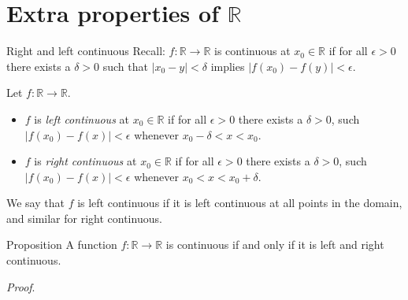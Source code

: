 \documentclass [aspectratio=169]{beamer}
\newcommand{\R}{{\mathbb{R}}}
\begin{document}
\begin{frame}

\end{frame}

\section{Extra properties of $\R$}


\begin{frame}{Right and left continuous}
Recall: $f\colon \R \to \R$ is continuous at $x_0\in \R$ if for all $\epsilon>0$ there exists a $\delta>0$ such that $\vert x_0-y\vert <\delta$ implies $\vert f(x_0)-f(y)\vert<\epsilon$.

\vspace{1em}

\begin{definition} Let $f\colon \R \to \R$.
\begin{itemize}
    \item $f$ is \emph{left continuous} at $x_0\in \R$ if for all $\epsilon >0$ there exists a $\delta>0$, such $\vert f(x_0)-f(x)\vert<\epsilon$ whenever $ x_0-\delta <x<x_0$.
    \item $f$ is \emph{right continuous} at $x_0\in \R$ if for all $\epsilon >0$ there exists a $\delta>0$, such $\vert f(x_0)-f(x)\vert<\epsilon$ whenever $x_0<x<x_0+\delta$.
\end{itemize}
We say that $f$ is left continuous if it is left continuous at all points in the domain, and similar for right continuous.
\end{definition}




\end{frame}


\begin{frame}
\begin{exampleblock}{Proposition}
 A function $f\colon \R \to \R$ is continuous if and only if it is left and right continuous. 
\end{exampleblock}
\textit{Proof}.
\vspace{5cm}
\end{frame}


\begin{frame}

\vspace{7cm}

\end{frame}
\end{document}
